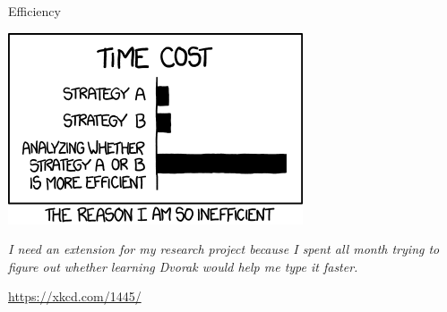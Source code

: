
\begin{frame}[t,plain]
\titlepage
\end{frame}


\begin{frame}{Efficiency}
%
\begin{center}
	\includegraphics[width=.4\linewidth]{./gfx/05-xkcd-efficiency}\\
	\vspace{6pt}
	
	\scriptsize
	\emph{I need an extension for my research project because I spent all month trying to figure out whether learning Dvorak would help me type it faster.}

	\vspace{6pt}
	\url{https://xkcd.com/1445/}
\end{center}
%
\end{frame}


